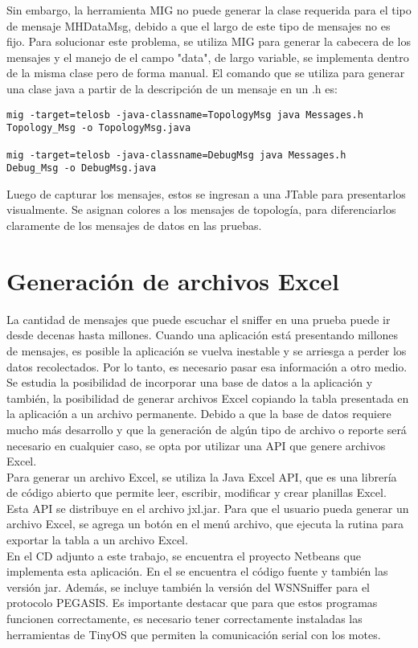 Sin embargo, la herramienta MIG no puede generar la clase requerida para el tipo de mensaje MHDataMsg, debido a que el largo de este tipo de mensajes no es fijo. Para solucionar este problema, se utiliza MIG para generar la cabecera de los mensajes y el manejo de el campo "data", de largo variable, se implementa dentro de la misma clase pero de forma manual. El comando que se utiliza para generar una clase java a partir de la descripción de un mensaje en un .h es:\\

\begin{verbatim}
mig -target=telosb -java-classname=TopologyMsg java Messages.h 
Topology_Msg -o TopologyMsg.java

mig -target=telosb -java-classname=DebugMsg java Messages.h 
Debug_Msg -o DebugMsg.java
\end{verbatim}

Luego de capturar los mensajes, estos se ingresan a una JTable para presentarlos visualmente. Se asignan colores a los mensajes de topología, para diferenciarlos claramente de los mensajes de datos en las pruebas. 

\section{Generación de archivos Excel}
La cantidad de mensajes que puede escuchar el sniffer en una prueba puede ir desde decenas hasta millones. Cuando una aplicación está presentando millones de mensajes, es posible la aplicación se vuelva inestable y se arriesga a perder los datos recolectados. Por lo tanto, es necesario pasar esa información a otro medio. Se estudia la posibilidad de incorporar una base de datos a la aplicación y también, la posibilidad de generar archivos Excel copiando la tabla presentada en la aplicación a un archivo permanente. Debido a que la base de datos requiere mucho más desarrollo y que la generación de algún tipo de archivo o reporte será necesario en cualquier caso, se opta por utilizar una API que genere archivos Excel.\\

Para generar un archivo Excel, se utiliza la Java Excel API, que es una librería de código abierto que permite leer, escribir, modificar y crear planillas Excel. Esta API se distribuye en el archivo jxl.jar. Para que el usuario pueda generar un archivo Excel, se agrega un botón en el menú archivo, que ejecuta la rutina para exportar la tabla a un archivo Excel.\\

En el CD adjunto a este trabajo, se encuentra el proyecto Netbeans que implementa esta aplicación. En el se encuentra el código fuente y también las versión jar. Además, se incluye también la versión del WSNSniffer para el protocolo PEGASIS. Es importante destacar que para que estos programas funcionen correctamente, es necesario tener correctamente instaladas las herramientas de TinyOS que permiten la comunicación serial con los motes.
